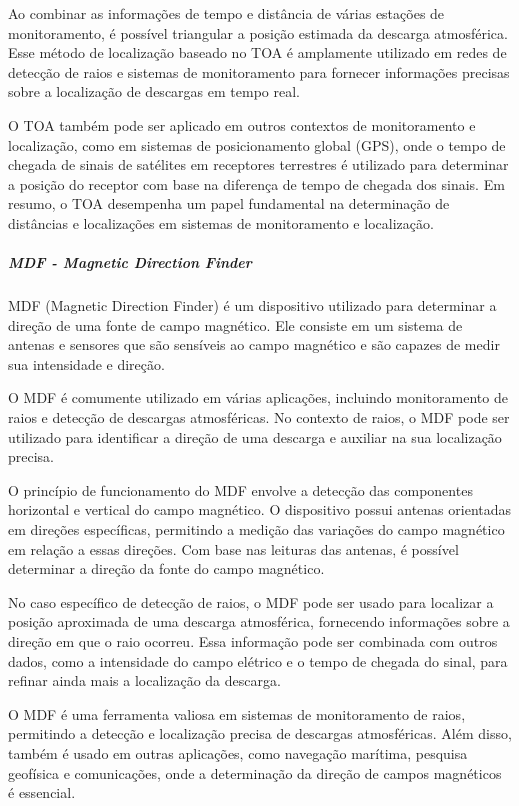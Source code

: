 \documentclass[a4paper, 12pt, onecolumn,singlespacing]{article}
\begin{document}
	Ao combinar as informações de tempo e distância de várias estações de monitoramento, é possível triangular a posição estimada da descarga atmosférica. Esse método de localização baseado no TOA é amplamente utilizado em redes de detecção de raios e sistemas de monitoramento para fornecer informações precisas sobre a localização de descargas em tempo real.
	
	O TOA também pode ser aplicado em outros contextos de monitoramento e localização, como em sistemas de posicionamento global (GPS), onde o tempo de chegada de sinais de satélites em receptores terrestres é utilizado para determinar a posição do receptor com base na diferença de tempo de chegada dos sinais. Em resumo, o TOA desempenha um papel fundamental na determinação de distâncias e localizações em sistemas de monitoramento e localização.
	
	\subparagraph{MDF - \textit{Magnetic Direction Finder}}
	
	MDF (Magnetic Direction Finder) é um dispositivo utilizado para determinar a direção de uma fonte de campo magnético. Ele consiste em um sistema de antenas e sensores que são sensíveis ao campo magnético e são capazes de medir sua intensidade e direção.
	
	O MDF é comumente utilizado em várias aplicações, incluindo monitoramento de raios e detecção de descargas atmosféricas. No contexto de raios, o MDF pode ser utilizado para identificar a direção de uma descarga e auxiliar na sua localização precisa.
	
	O princípio de funcionamento do MDF envolve a detecção das componentes horizontal e vertical do campo magnético. O dispositivo possui antenas orientadas em direções específicas, permitindo a medição das variações do campo magnético em relação a essas direções. Com base nas leituras das antenas, é possível determinar a direção da fonte do campo magnético.
	
	No caso específico de detecção de raios, o MDF pode ser usado para localizar a posição aproximada de uma descarga atmosférica, fornecendo informações sobre a direção em que o raio ocorreu. Essa informação pode ser combinada com outros dados, como a intensidade do campo elétrico e o tempo de chegada do sinal, para refinar ainda mais a localização da descarga.
	
	O MDF é uma ferramenta valiosa em sistemas de monitoramento de raios, permitindo a detecção e localização precisa de descargas atmosféricas. Além disso, também é usado em outras aplicações, como navegação marítima, pesquisa geofísica e comunicações, onde a determinação da direção de campos magnéticos é essencial.
	
\end{document}
